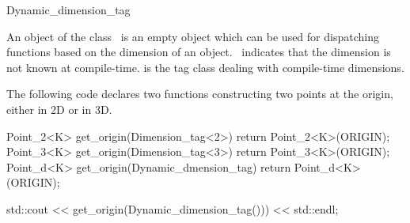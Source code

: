 \begin{ccRefClass} {Dynamic_dimension_tag}

\ccDefinition
An object of the class \ccRefName\ is an empty object which can be used
for dispatching functions based on the dimension of an object.
\ccRefName\ indicates that the dimension is not known at compile-time.
 is the tag class dealing with compile-time dimensions.


\ccExample

The following code declares two functions constructing two points at the origin,
either in 2D or in 3D.

\begin{cprog}
  Point_2<K> get_origin(Dimension_tag<2>) { return Point_2<K>(ORIGIN); }
  Point_3<K> get_origin(Dimension_tag<3>) { return Point_3<K>(ORIGIN); }
  Point_d<K> get_origin(Dynamic_dmension_tag) { return Point_d<K>(ORIGIN); }

  std::cout << get_origin(Dynamic_dimension_tag())) << std::endl;
\end{cprog}

\ccSeeAlso
{} \\
 \\

\end{ccRefClass}
